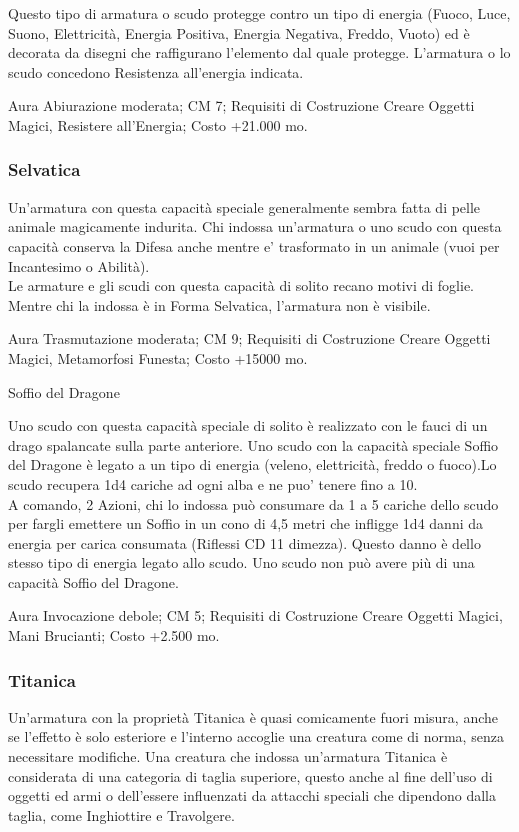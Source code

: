 \begin{multicols}{2}
Questo tipo di armatura o scudo protegge contro un tipo di energia (Fuoco, Luce, Suono, Elettricità, Energia Positiva, Energia Negativa, Freddo, Vuoto) ed è decorata da disegni che raffigurano l'elemento dal quale protegge. L'armatura o lo scudo concedono Resistenza all'energia indicata.

Aura Abiurazione moderata; CM 7; Requisiti di Costruzione Creare Oggetti Magici, Resistere all'Energia; Costo +21.000 mo.

\subsubsection{Selvatica}

Un'armatura con questa capacità speciale generalmente sembra fatta di pelle animale magicamente indurita. Chi indossa un'armatura o uno scudo con questa capacità conserva la Difesa anche mentre e' trasformato in un animale (vuoi per Incantesimo o Abilità).\\
Le armature e gli scudi con questa capacità di solito recano motivi di foglie. Mentre chi la indossa è in Forma Selvatica, l'armatura non è visibile.

Aura Trasmutazione moderata; CM 9; Requisiti di Costruzione Creare Oggetti Magici, Metamorfosi Funesta; Costo +15000 mo.

Soffio del Dragone

Uno scudo con questa capacità speciale di solito è realizzato con le fauci di un drago spalancate sulla parte anteriore. Uno scudo con la capacità speciale Soffio del Dragone è legato a un tipo di energia (veleno, elettricità, freddo o fuoco).Lo scudo recupera 1d4 cariche ad ogni alba e ne puo' tenere fino a 10. \\
A comando, 2 Azioni, chi lo indossa può consumare da 1 a 5 cariche dello scudo per fargli emettere un Soffio in un cono di 4,5 metri che infligge 1d4 danni da energia per carica consumata (Riflessi CD 11 dimezza). Questo danno è dello stesso tipo di energia legato allo scudo. Uno scudo non può avere più di una capacità Soffio del Dragone.

Aura Invocazione debole; CM 5; Requisiti di Costruzione Creare Oggetti Magici, Mani Brucianti; Costo +2.500 mo.


\subsubsection{Titanica}

Un'armatura con la proprietà Titanica è quasi comicamente fuori misura, anche se l'effetto è solo esteriore e l'interno accoglie una creatura come di norma, senza necessitare modifiche. Una creatura che indossa un'armatura Titanica è considerata di una categoria di taglia superiore, questo anche al fine dell'uso di oggetti ed armi o dell'essere influenzati da attacchi speciali che dipendono dalla taglia, come Inghiottire e Travolgere.\\


\end{multicols}
